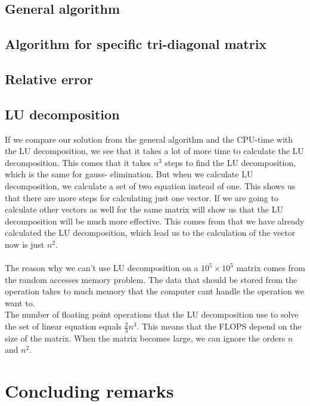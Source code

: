 \documentclass[norsk,a4paper,12pt]{article}
\begin{document}
\subsection{General algorithm}

\subsection{Algorithm for specific tri-diagonal matrix}

 \subsection{Relative error}
 
  \subsection{LU decomposition}
 If we compare our solution from the general algorithm and the CPU-time with the LU decomposition, we see that it takes a lot of more time to calculate the LU decomposition. This comes that it takes $n^3$ steps to find the LU decomposition, which is the same for gauss- elimination. But when we calculate LU decomposition, we calculate a set of two equation instead of one. This shows us that there are more steps for calculating just one vector. If we are going to calculate other vectors as well for the same matrix will show us that the LU decomposition will be much more effective. This comes from that we have already calculated the LU decomposition, which lead us to the calculation of the vector now is just $n^2$.    
\\
\\
The reason why we can’t use LU decomposition on a $10^5 \times 10^5$ matrix comes from the random accesses memory problem. The data that should be stored from the operation takes to much memory that the computer cant handle the operation we want to.  
\\
The number of floating point operations that the LU decomposition use to solve the set of linear equation equals $\frac{2}{3} n^3$. This means that the FLOPS depend on the size of the matrix. When the matrix becomes large, we can ignore the orders $n$ and $n^2$.        
\section{Concluding remarks}


\end{document}

